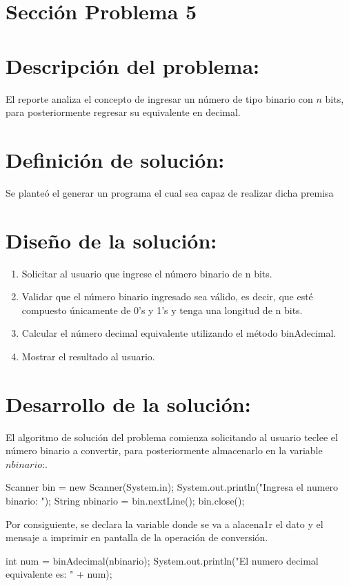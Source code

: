 \documentclass{IEEEcsmag}
\begin{document}
\section{Sección Problema 5}
\section*{Descripción del problema:}
El reporte analiza el concepto de ingresar un número de tipo binario con $n$ bits, para posteriormente regresar su equivalente en decimal.

\section*{Definición de solución:}
Se planteó el generar un programa el cual sea capaz de realizar dicha premisa

\section*{Diseño de la solución:}
\begin{enumerate}
    \item Solicitar al usuario que ingrese el número binario de n bits.
    \item Validar que el número binario ingresado sea válido, es decir, que esté compuesto únicamente de 0's y 1's y tenga una longitud de n bits.
    \item Calcular el número decimal equivalente utilizando el método binAdecimal.
    \item Mostrar el resultado al usuario.
\end{enumerate}

\section*{Desarrollo de la solución:}
El algoritmo de solución del problema comienza solicitando al usuario teclee el número binario a convertir, para posteriormente almacenarlo en la variable $nbinario$:.
\begin{javaCode}
Scanner bin = new Scanner(System.in);
    System.out.println("Ingresa el numero binario: ");
    String nbinario = bin.nextLine();
    bin.close();
\end{javaCode}

Por consiguiente, se declara la variable donde se va a alacena1r el dato y el mensaje a imprimir en pantalla de la operación de conversión.

\begin{javaCode}
int num = binAdecimal(nbinario);
System.out.println("El numero decimal equivalente es: " + num);

\end{javaCode}
\end{document}
